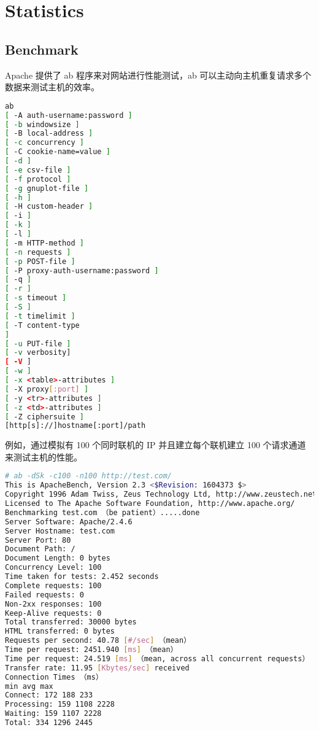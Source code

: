 \section{Statistics}


\subsection{Benchmark}


Apache 提供了 ab 程序来对网站进行性能测试，ab 可以主动向主机重复请求多个数据来测试主机的效率。



\begin{lstlisting}[language=bash]
ab
[ -A auth-username:password ]
[ -b windowsize ]
[ -B local-address ]
[ -c concurrency ]
[ -C cookie-name=value ]
[ -d ]
[ -e csv-file ]
[ -f protocol ]
[ -g gnuplot-file ]
[ -h ]
[ -H custom-header ]
[ -i ]
[ -k ]
[ -l ]
[ -m HTTP-method ]
[ -n requests ]
[ -p POST-file ]
[ -P proxy-auth-username:password ]
[ -q ]
[ -r ]
[ -s timeout ]
[ -S ]
[ -t timelimit ]
[ -T content-type
]
[ -u PUT-file ]
[ -v verbosity]
[ -V ]
[ -w ]
[ -x <table>-attributes ]
[ -X proxy[:port] ]
[ -y <tr>-attributes ]
[ -z <td>-attributes ]
[ -Z ciphersuite ]
[http[s]://]hostname[:port]/path
\end{lstlisting}


例如，通过模拟有 100 个同时联机的 IP 并且建立每个联机建立 100 个请求通道来测试主机的性能。


\begin{lstlisting}[language=bash]
# ab -dSk -c100 -n100 http://test.com/
This is ApacheBench, Version 2.3 <$Revision: 1604373 $>
Copyright 1996 Adam Twiss, Zeus Technology Ltd, http://www.zeustech.net/
Licensed to The Apache Software Foundation, http://www.apache.org/
Benchmarking test.com （be patient）.....done
Server Software: Apache/2.4.6
Server Hostname: test.com
Server Port: 80
Document Path: /
Document Length: 0 bytes
Concurrency Level: 100
Time taken for tests: 2.452 seconds
Complete requests: 100
Failed requests: 0
Non-2xx responses: 100
Keep-Alive requests: 0
Total transferred: 30000 bytes
HTML transferred: 0 bytes
Requests per second: 40.78 [#/sec] （mean）
Time per request: 2451.940 [ms] （mean）
Time per request: 24.519 [ms] （mean, across all concurrent requests）
Transfer rate: 11.95 [Kbytes/sec] received
Connection Times （ms）
min avg max
Connect: 172 188 233
Processing: 159 1108 2228
Waiting: 159 1107 2228
Total: 334 1296 2445
\end{lstlisting}


